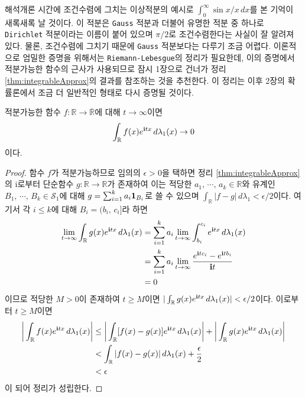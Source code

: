 해석개론 시간에 조건수렴에 그치는 이상적분의 예시로 $\int_0^\infty\sin x/x\,dx$를 본 기억이 새록새록 날 것이다. 이 적분은 \texttt{Gauss} 적분과 더불어 유명한 적분 중 하나로 \texttt{Dirichlet} 적분이라는 이름이 붙어 있으며 $\pi/2$로 조건수렴한다는 사실이 잘 알려져 있다. 물론, 조건수렴에 그치기 때문에 \texttt{Gauss} 적분보다는 다루기 조금 어렵다. 이론적으로 엄밀한 증명을 위해서는 \texttt{Riemann-Lebesgue}의 정리가 필요한데, 이의 증명에서 적분가능한 함수의 근사가 사용되므로 잠시 1장으로 건너가 정리 \ref{thm:integrableApprox}의 결과를 참조하는 것을 추천한다. 이 정리는 이후 2장의 확률론에서 조금 더 일반적인 형태로 다시 증명될 것이다.

\begin{theorem}
    적분가능한 함수 $f:\mathbb{R}\to\overline{\mathbb{R}}$에 대해 $ t\to\infty$이면
    \begin{equation*}
        \int_{\mathbb{R}}f(x)e^{\mathbf{i} t x}\,d\lambda_1(x)\to0
    \end{equation*}
    이다.
\end{theorem}

\begin{proof}
    함수 $f$가 적분가능하므로 임의의 $\epsilon>0$을 택하면 정리 \ref{thm:integrableApprox}의 i로부터 단순함수 $g:\mathbb{R}\to\mathbb{R}$가 존재하여 이는 적당한 $a_1,\,\cdots,\,a_k\in\mathbb{R}$와 유계인 $B_1,\,\cdots,\,B_k\in\mathcal{S}_1$에 대해 $g=\sum_{i=1}^ka_i\mathbf{1}_{B_i}$로 쓸 수 있으며 $\int_{\mathbb{R}}|f-g|\,d\lambda_1<\epsilon/2$이다. 여기서 각 $i\leq k$에 대해 $B_i=(b_i,\,c_i]$라 하면
    \begin{align*}
        \lim_{ t\to\infty}\int_{\mathbb{R}}g(x)e^{\mathbf{i} t x}\,d\lambda_1(x)&=\sum_{i=1}^ka_i\lim_{ t\to\infty}\int_{b_i}^{c_i}e^{\mathbf{i} t x}\,d\lambda_1(x)\\
        &=\sum_{i=1}^ka_i\lim_{ t\to\infty}\frac{e^{\mathbf{i} t c_i}-e^{\mathbf{i} t b_i}}{\mathbf{i} t}\\
        &=0
    \end{align*}
    이므로 적당한 $M>0$이 존재하여 $ t\geq M$이면 $|\int_{\mathbb{R}}g(x)e^{\mathbf{i} t x}\,d\lambda_1(x)|<\epsilon/2$이다. 이로부터 $ t\geq M$이면
    \begin{align*}
        \bigg|\int_{\mathbb{R}}f(x)e^{\mathbf{i} t x}\,d\lambda_1(x)\bigg|&\leq\bigg|\int_{\mathbb{R}}[f(x)-g(x)]e^{\mathbf{i} t x}\,d\lambda_1(x)\bigg|+\bigg|\int_{\mathbb{R}}g(x)e^{\mathbf{i} t x}\,d\lambda_1(x)\bigg|\\
        &<\int_{\mathbb{R}}|f(x)-g(x)|\,d\lambda_1(x)+\frac{\epsilon}{2}\\
        &<\epsilon
    \end{align*}
    이 되어 정리가 성립한다.
\end{proof}

